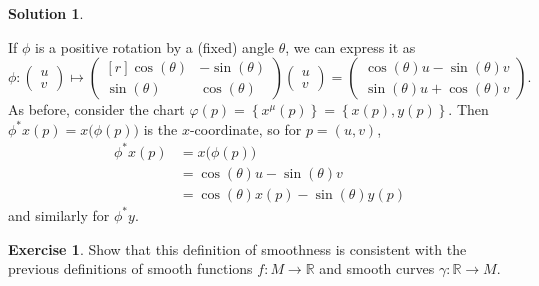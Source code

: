 \documentclass[11pt, a4paper]{report}
\theoremstyle{definition}
\newtheorem{exercise}{Exercise}[part]
\newtheorem{solution}{Solution}[part]
\newenvironment{ex}{\begin{exercise}}{\end{exercise}\pagebreak[1]}
\newenvironment{sol}{\begin{solution}}{\end{solution}\pagebreak[3]}
\begin{document}
\begin{sol}\label{sol:pullbackrotation}

If $\phi$ is a positive rotation by a (fixed) angle $\theta$, we can express it as
\[
    \phi: \begin{pmatrix}
            u \\ v
        \end{pmatrix}
        \mapsto
        \begin{pmatrix*}[r]
            \cos(\theta) & -\sin(\theta) \\
            \sin(\theta) & \cos(\theta)
        \end{pmatrix*}
        \begin{pmatrix}
            u \\ v
        \end{pmatrix}
        =
        \begin{pmatrix}
            \cos(\theta) u - \sin(\theta) v \\
            \sin(\theta) u + \cos(\theta) v
        \end{pmatrix}.
\]
As before, consider the chart $\varphi(p) = \left\{x^\mu(p)\right\} = \left\{x(p), y(p)\right\}$.
Then $\phi^* x(p) = x\bigl(\phi(p)\bigr)$ is the $x$-coordinate, so for $p = (u, v)$,
\begin{align*}
    \phi^* x(p) &= x \bigl( \phi(p) \bigr) \\
                &= \cos(\theta) u - \sin(\theta) v \\
                &= \cos(\theta) x(p) - \sin(\theta) y(p)
\end{align*}
and similarly for $\phi^* y$.

\end{sol}

\begin{ex}

Show that this definition of smoothness is consistent with the previous definitions of smooth functions $f: M \to \mathbb{R}$ and smooth curves $\gamma: \mathbb{R} \to M$.

\end{ex}
\end{document}
